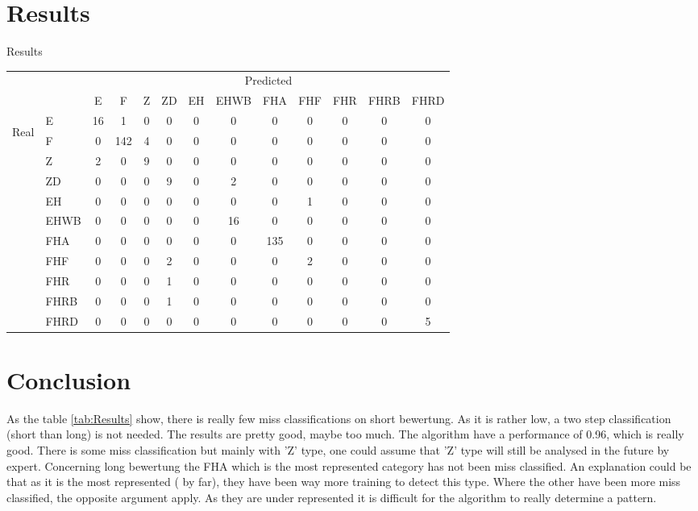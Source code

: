 \section{Results}
{Results}
{\label{tab:Results}} 
{\begin{tabular}{|c|l|c|c|c|c|c|c|c|c|c|c|c|}
\cline{3-13}
\multicolumn{2}{c|}{\multirow{2}{*}{}} &\multicolumn{11}{c|}{Predicted}\\ \cline{3-13}
\multicolumn{2}{c|}{} & E & F & Z & ZD & EH & EHWB & FHA & FHF & FHR & FHRB & FHRD\\\hline
\multirow{11}{*}{\begin{sideways}Real\end{sideways}} & E & 16 & 1 & 0 & 0 & 0 & 0 & 0 & 0 & 0 & 0 & 0\\  \cline{2-13}
& F & 0 & 142 & 4 & 0 & 0 & 0 & 0 & 0 & 0 & 0 & 0\\  \cline{2-13}
& Z & 2 & 0 & 9 & 0 & 0 & 0 & 0 & 0 & 0 & 0 & 0\\  \cline{2-13}
& ZD & 0 & 0 & 0 & 9 & 0 & 2 & 0 & 0 & 0 & 0 & 0\\  \cline{2-13}
& EH & 0 & 0 & 0 & 0 & 0 & 0 & 0 & 1 & 0 & 0 & 0\\ \cline{2-13}
& EHWB & 0 & 0 & 0 & 0 & 0 & 16 & 0 & 0 & 0 & 0 & 0\\\cline{2-13}
& FHA & 0 & 0 & 0 & 0 & 0 & 0 & 135 & 0 & 0 & 0 & 0\\\cline{2-13}
& FHF & 0 & 0 & 0 & 2 & 0 & 0 & 0 & 2 & 0 & 0 & 0\\  \cline{2-13}
& FHR & 0 & 0 & 0 & 1 & 0 & 0 & 0 & 0 & 0 & 0 & 0\\  \cline{2-13}
& FHRB & 0 & 0 & 0 & 1 & 0 & 0 & 0 & 0 & 0 & 0 & 0\\ \cline{2-13}
& FHRD & 0 & 0 & 0 & 0 & 0 & 0 & 0 & 0 & 0 & 0 & 5\\ \hline
\end{tabular}}
{}


\section{Conclusion} 

As the table \ref{tab:Results} show, there is really few miss classifications on short bewertung. As it is rather low, a two step classification (short than long) is not needed. The results are pretty good, maybe too much. The algorithm have a performance of 0.96, which is really good. There is some miss classification but mainly with 'Z' type, one could assume that 'Z' type will still be analysed in the future by expert. Concerning long bewertung the FHA which is the most represented category has not been miss classified. An explanation could be that as it is the most represented ( by far), they have been way more training to detect this type. Where the other have been more miss classified, the opposite argument apply. As they are under represented it is difficult for the algorithm to really determine a pattern. 

